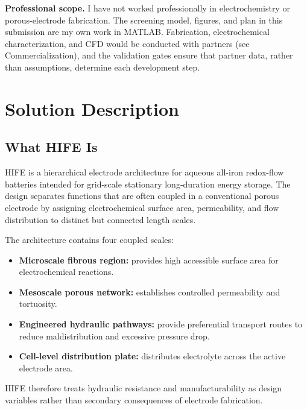 \documentclass[11pt,letterpaper]{article}
\begin{document}
\textbf{Professional scope.}
I have not worked professionally in electrochemistry or porous-electrode
fabrication. The screening model, figures, and plan in this submission are
my own work in MATLAB. Fabrication, electrochemical characterization, and CFD
would be conducted with partners (see Commercialization), and the validation
gates ensure that partner data, rather than assumptions, determine each
development step.


\section{Solution Description}

\subsection{What HIFE Is}

HIFE is a hierarchical electrode architecture for aqueous all-iron
redox-flow batteries intended for grid-scale stationary long-duration
energy storage. The design separates functions that are often coupled in a
conventional porous electrode by assigning electrochemical surface area,
permeability, and flow distribution to distinct but connected length
scales.

The architecture contains four coupled scales:

\begin{itemize}
    \item \textbf{Microscale fibrous region:} provides high accessible
    surface area for electrochemical reactions.

    \item \textbf{Mesoscale porous network:} establishes controlled
    permeability and tortuosity.

    \item \textbf{Engineered hydraulic pathways:} provide preferential
    transport routes to reduce maldistribution and excessive pressure
    drop.

    \item \textbf{Cell-level distribution plate:} distributes electrolyte
    across the active electrode area.
\end{itemize}

HIFE therefore treats hydraulic resistance and manufacturability as design
variables rather than secondary consequences of electrode fabrication.
\end{document}
